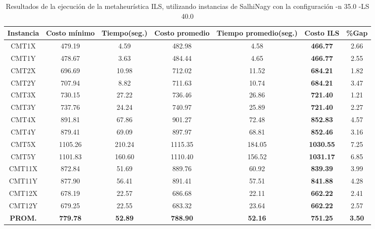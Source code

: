 \begin{table}[ht]
\caption{Resultados de la ejecución de la metaheurística ILS, utilizando instancias de SalhiNagy con la configuración -n 35.0 -LS 40.0}
\centering
\small
\begin{tabular}{c c c c c c c}
\hline\hline
Instancia & Costo mínimo & Tiempo(seg.) & Costo promedio & Tiempo promedio(seg.) & Costo ILS & \%Gap \\ [0.5ex]
\hline
CMT1X & 479.19 & 4.59 & 
482.98 & 4.58 & \bf{466.77} & 
2.66\\CMT1Y & 478.67 & 3.63 & 
484.44 & 4.65 & \bf{466.77} & 
2.55\\CMT2X & 696.69 & 10.98 & 
712.02 & 11.52 & \bf{684.21} & 
1.82\\CMT2Y & 707.94 & 8.82 & 
711.63 & 10.74 & \bf{684.21} & 
3.47\\CMT3X & 730.15 & 27.22 & 
736.46 & 26.86 & \bf{721.40} & 
1.21\\CMT3Y & 737.76 & 24.24 & 
740.97 & 25.89 & \bf{721.40} & 
2.27\\CMT4X & 891.81 & 67.86 & 
901.27 & 72.48 & \bf{852.83} & 
4.57\\CMT4Y & 879.41 & 69.09 & 
897.97 & 68.81 & \bf{852.46} & 
3.16\\CMT5X & 1105.26 & 210.24 & 
1115.35 & 184.05 & \bf{1030.55} & 
7.25\\CMT5Y & 1101.83 & 160.60 & 
1110.40 & 156.52 & \bf{1031.17} & 
6.85\\CMT11X & 872.84 & 51.69 & 
889.76 & 60.92 & \bf{839.39} & 
3.99\\CMT11Y & 877.90 & 56.41 & 
891.41 & 57.51 & \bf{841.88} & 
4.28\\CMT12X & 678.19 & 22.57 & 
686.68 & 22.11 & \bf{662.22} & 
2.41\\CMT12Y & 679.25 & 22.55 & 
683.32 & 23.64 & \bf{662.22} & 
2.57\\\bf{PROM.} & 
\bf{779.78} & \bf{52.89} & \bf{788.90} & \bf{52.16} & \bf{751.25} & \bf{3.50}\\[1ex]\hline
\end{tabular}
\label{table:nonlin}
\end{table} \clearpage
